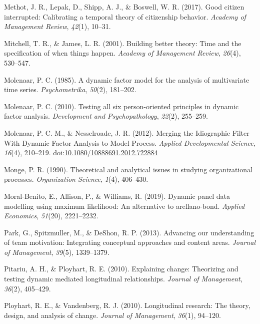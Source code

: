 \documentclass[english,,man]{apa6}
\begin{document}
\leavevmode\hypertarget{ref-methot2017good}{}%
Methot, J. R., Lepak, D., Shipp, A. J., \& Boswell, W. R. (2017). Good citizen interrupted: Calibrating a temporal theory of citizenship behavior. \emph{Academy of Management Review}, \emph{42}(1), 10--31.

\leavevmode\hypertarget{ref-mitchell_building_2001}{}%
Mitchell, T. R., \& James, L. R. (2001). Building better theory: Time and the specification of when things happen. \emph{Academy of Management Review}, \emph{26}(4), 530--547.

\leavevmode\hypertarget{ref-molenaar_dynamic_1985}{}%
Molenaar, P. C. (1985). A dynamic factor model for the analysis of multivariate time series. \emph{Psychometrika}, \emph{50}(2), 181--202.

\leavevmode\hypertarget{ref-molenaar_testing_2010}{}%
Molenaar, P. C. (2010). Testing all six person-oriented principles in dynamic factor analysis. \emph{Development and Psychopathology}, \emph{22}(2), 255--259.

\leavevmode\hypertarget{ref-molenaar_merging_2012}{}%
Molenaar, P. C. M., \& Nesselroade, J. R. (2012). Merging the Idiographic Filter With Dynamic Factor Analysis to Model Process. \emph{Applied Developmental Science}, \emph{16}(4), 210--219. doi:\href{https://doi.org/10.1080/10888691.2012.722884}{10.1080/10888691.2012.722884}

\leavevmode\hypertarget{ref-monge_theoretical_1990}{}%
Monge, P. R. (1990). Theoretical and analytical issues in studying organizational processes. \emph{Organization Science}, \emph{1}(4), 406--430.

\leavevmode\hypertarget{ref-moral2019dynamic}{}%
Moral-Benito, E., Allison, P., \& Williams, R. (2019). Dynamic panel data modelling using maximum likelihood: An alternative to arellano-bond. \emph{Applied Economics}, \emph{51}(20), 2221--2232.

\leavevmode\hypertarget{ref-park2013advancing}{}%
Park, G., Spitzmuller, M., \& DeShon, R. P. (2013). Advancing our understanding of team motivation: Integrating conceptual approaches and content areas. \emph{Journal of Management}, \emph{39}(5), 1339--1379.

\leavevmode\hypertarget{ref-pitariu_explaining_2010}{}%
Pitariu, A. H., \& Ployhart, R. E. (2010). Explaining change: Theorizing and testing dynamic mediated longitudinal relationships. \emph{Journal of Management}, \emph{36}(2), 405--429.

\leavevmode\hypertarget{ref-ployhart_longitudinal_2010}{}%
Ployhart, R. E., \& Vandenberg, R. J. (2010). Longitudinal research: The theory, design, and analysis of change. \emph{Journal of Management}, \emph{36}(1), 94--120.
\end{document}
